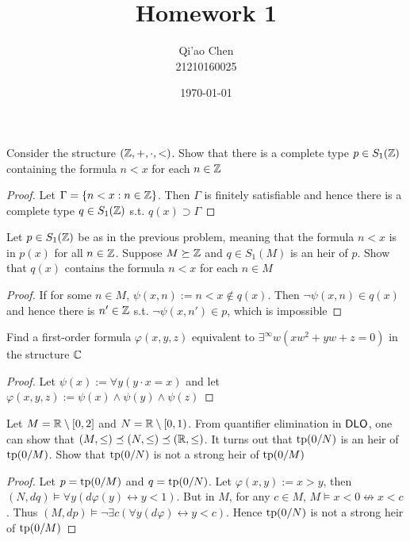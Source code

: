 \documentclass[11pt]{article}
\author{Qi'ao Chen\\21210160025}
\date{\today}
\title{Homework 1}
\begin{document}
\maketitle
\begin{exercise}
Consider the structure \((\mathbb{Z},+,\cdot,<)\). Show that there is a complete type \(p\in S_1(\mathbb{Z})\) containing the
formula \(n<x\) for each \(n\in\mathbb{Z}\)
\end{exercise}

\begin{proof}
Let \(\Gamma=\{n<x:n\in\mathbb{Z}\}\). Then \(\Gamma\) is finitely satisfiable and hence there is a complete type \(q\in S_1(\mathbb{Z})\)
s.t. \(q(x)\supset\Gamma\)
\end{proof}

\begin{exercise}
Let \(p\in S_1(\mathbb{Z})\) be as in the previous problem, meaning that the formula \(n<x\) is in \(p(x)\) for
all \(n\in\mathbb{Z}\). Suppose \(M\succeq\mathbb{Z}\) and \(q\in S_1(M)\) is an heir of \(p\). Show that \(q(x)\) contains the
formula \(n<x\) for each \(n\in M\)
\end{exercise}

\begin{proof}
If for some \(n\in M\), \(\psi(x,n):=n<x\notin q(x)\). Then \(\neg\psi(x,n)\in q(x)\) and hence there is \(n'\in\mathbb{Z}\)
s.t. \(\neg\psi(x,n')\in p\), which is impossible
\end{proof}

\begin{exercise}
Find a first-order formula \(\varphi(x,y,z)\) equivalent to \(\exists^\infty w(xw^2+yw+z=0)\) in the structure \(\mathbb{C}\)
\end{exercise}

\begin{proof}
Let \(\psi(x):=\forall y(y\cdot x=x)\) and let \(\varphi(x,y,z):=\psi(x)\wedge\psi(y)\wedge\psi(z)\)
\end{proof}

\begin{exercise}
Let \(M=\mathbb{R}\setminus[0,2]\) and \(N=\mathbb{R}\setminus[0,1)\). From quantifier elimination in \(\operatorname{\textsf{DLO}}\), one can show
that \((M,\le)\preceq(N,\le)\preceq(\mathbb{R},\le)\). It turns out that \(\operatorname{tp}(0/N)\) is an heir of \(\operatorname{tp}(0/M)\). Show
that \(\operatorname{tp}(0/N)\) is not a strong heir of \(\operatorname{tp}(0/M)\)
\end{exercise}

\begin{proof}
Let \(p=\operatorname{tp}(0/M)\) and \(q=\operatorname{tp}(0/N)\). Let \(\varphi(x,y):=x>y\), then \((N,dq)\vDash\forall y(d\varphi(y)\leftrightarrow y<1)\).
But in \(M\), for any \(c\in M\), \(M\vDash x<0\not\leftrightarrow x<c\). Thus \((M,dp)\vDash\neg\exists c(\forall y(d\varphi)\leftrightarrow y<c)\).
Hence \(\operatorname{tp}(0/N)\) is not a strong heir of \(\operatorname{tp}(0/M)\)
\end{proof}
\end{document}
